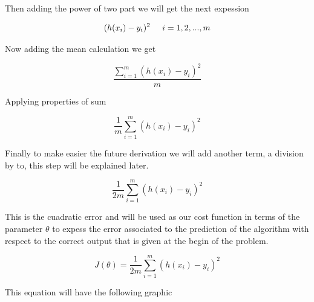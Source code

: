 \documentclass[12pt,journal]{IEEEtran}
\begin{document}
    Then adding the power of two part we will get the next expession

    \begin{equation}
        (h(x_i) - y_i)^2 \hspace{0.5cm} i=1, 2, ..., m
    \end{equation}

    Now adding the mean calculation we get

    \begin{equation}
        \frac{\sum_{i=1}^{m} (h(x_i) - y_i)^2}{m}
    \end{equation}

    Applying properties of sum

    \begin{equation}
       \frac{1}{m} \sum_{i=1}^{m} ( h(x_i) - y_i )^2
    \end{equation}

    Finally to make easier the future derivation we will add another term, a
    division by to, this step will be explained later.

    \begin{equation}
       \frac{1}{2m} \sum_{i=1}^{m} ( h(x_i) - y_i )^2
    \end{equation}

    This is the cuadratic error and will be used as our cost function in terms
    of the parameter $\theta$ to expess the error associated to the prediction
    of the algorithm with respect to the correct output that is given at the
    begin of the problem.

    \begin{equation}
       J(\theta) = \frac{1}{2m} \sum_{i=1}^{m} ( h(x_i) - y_i )^2
    \end{equation}

    This equation will have the following graphic

    \begin{figure}[h!]
    \end{figure}
\end{document}
